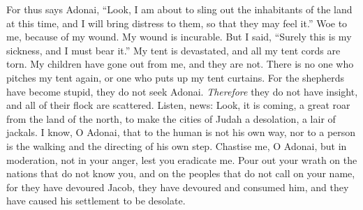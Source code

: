 \begin{biblechapter}
\verse For thus says Adonai, “Look, I am about to sling out the inhabitants of the land at this time, 
and I will bring distress to them, so that they may feel it.”
 Woe to me, because of my wound. 
My wound is incurable. 
But I said, “Surely this is my sickness, 
and I must bear it.”
\verse My tent is devastated, 
and all my tent cords are torn. 
My children have gone out from me, 
and they are not. 
There is no one who pitches my tent again, 
or one who puts up my tent curtains.
\verse For the shepherds have become stupid, 
they do not seek Adonai. 
\textit{Therefore} they do not have insight, 
and all of their flock are scattered.
\verse Listen, news: 
Look, it is coming, 
a great roar from the land of the north, 
to make the cities of Judah a desolation, 
a lair of jackals.
\verse I know, O Adonai, that to the human is not his own way, 
nor to a person is the walking and the directing of his own step.
\verse Chastise me, O Adonai, but in moderation, 
not in your anger, lest you eradicate me.
\verse Pour out your wrath on the nations that do not know you, 
and on the peoples that do not call on your name, 
for they have devoured Jacob, 
they have devoured and consumed him, 
and they have caused his settlement to be desolate.
\end{biblechapter}

